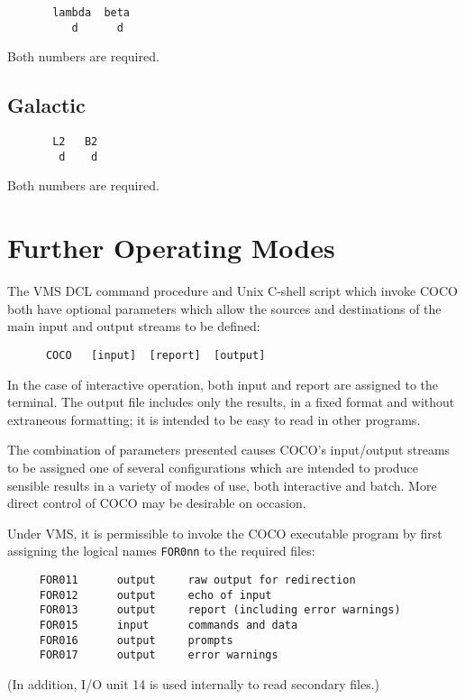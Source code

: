 \begin{verbatim} 
       lambda  beta
          d      d
\end{verbatim}

Both numbers are required.

\subsection{Galactic}

\begin{verbatim}
       L2   B2
        d    d
\end{verbatim}

Both numbers are required.

\section{Further Operating Modes}

The VMS DCL command procedure and Unix C-shell script which
invoke COCO
both have optional parameters which
allow the sources and destinations of the main input and
output streams to be defined:
\begin{verbatim}
      COCO   [input]  [report]  [output]
\end{verbatim}

In the case of interactive operation, both input and report
are assigned to the terminal.
The output file includes only the results, in a fixed format and
without extraneous formatting; it is intended to be
easy to read in other programs.

The combination of parameters presented causes COCO's
input/output streams to be assigned one of several configurations
which are intended to produce sensible results in a variety
of modes of use, both interactive and batch.
More direct control of COCO may be desirable on occasion.

Under VMS, it is permissible to invoke the COCO executable program
by first assigning the logical names \verb|FOR0nn| to the required
files:
\begin{verbatim}
     FOR011      output     raw output for redirection
     FOR012      output     echo of input
     FOR013      output     report (including error warnings)
     FOR015      input      commands and data
     FOR016      output     prompts
     FOR017      output     error warnings
\end{verbatim}

(In addition, I/O unit 14 is used internally to read secondary
files.)

